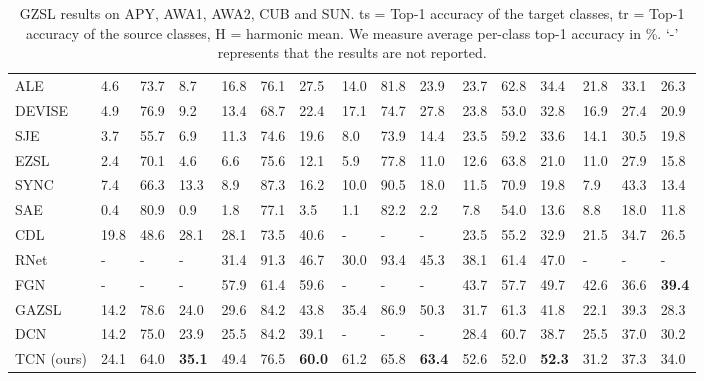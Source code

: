 \documentclass[10pt,twocolumn,letterpaper]{article}
\begin{document}
\begin{table*}[t]
\begin{center}
\begin{tabular}{|p{2cm}|p{0.5cm}p{0.5cm}p{0.5cm}|p{0.5cm}p{0.5cm}p{0.5cm}|p{0.5cm}p{0.5cm}p{0.5cm}|p{0.5cm}p{0.5cm}p{0.5cm}|p{0.5cm}p{0.5cm}p{0.5cm}|}
ALE \cite{akata2013label}                 &4.6   &73.7   &8.7   &16.8  &76.1   &27.5   &14.0  &81.8   &23.9   &23.7   &62.8   &34.4   &21.8   &33.1   &26.3 \\
DEVISE \cite{frome2013devise}             &4.9   &76.9   &9.2   &13.4  &68.7   &22.4   &17.1  &74.7   &27.8   &23.8   &53.0   &32.8   &16.9   &27.4   &20.9 \\
SJE \cite{akata2015evaluation}            &3.7   &55.7   &6.9   &11.3  &74.6   &19.6   &8.0   &73.9   &14.4   &23.5   &59.2   &33.6   &14.1   &30.5   &19.8 \\
EZSL \cite{romera2015embarrassingly}      &2.4   &70.1   &4.6   &6.6   &75.6   &12.1   &5.9   &77.8   &11.0   &12.6   &63.8   &21.0   &11.0   &27.9   &15.8 \\
SYNC \cite{Changpinyo2016SynthesizedCF}   &7.4   &66.3   &13.3  &8.9   &87.3   &16.2   &10.0  &90.5   &18.0   &11.5   &70.9   &19.8   &7.9    &43.3   &13.4 \\
SAE \cite{Kodirov2017SemanticAF}          &0.4   &80.9   &0.9   &1.8   &77.1   &3.5    &1.1   &82.2   &2.2    &7.8    &54.0   &13.6   &8.8    &18.0   &11.8 \\
CDL \cite{jiang2018learning}              &19.8  &48.6   &28.1  &28.1  &73.5   &40.6   &-     &-      &-      &23.5   &55.2   &32.9   &21.5   &34.7   &26.5 \\
RNet \cite{sung2018learning}              &-     &-      &-     &31.4  &91.3   &46.7   &30.0  &93.4   &45.3   &38.1   &61.4   &47.0   &-      &-      &-    \\
FGN \cite{xian2018feature}             &-     &-      &-     &57.9  &61.4   &59.6   &-     &-      &-   &43.7   &57.7   &49.7   &42.6    &36.6 &\textbf{39.4}    \\
GAZSL \cite{Zhu2018AGA}               &14.2  &78.6   &24.0  &29.6  &84.2   &43.8   &35.4     &86.9      &50.3      &31.7   &61.3   &41.8   &22.1 &39.3   &28.3 \\
DCN \cite{Liu2018GeneralizedZL}        &14.2  &75.0   &23.9  &25.5  &84.2   &39.1   &-     &-      &-      &28.4   &60.7   &38.7   &25.5   &37.0 &30.2 \\
\hline
TCN (ours)                               &24.1  &64.0   &\textbf{35.1}  &49.4  &76.5   &\textbf{60.0}   &61.2  &65.8   &\textbf{63.4}   &52.6 &52.0   &\textbf{52.3}   &31.2   &37.3   &34.0 \\
\hline
\end{tabular}
\end{center}
\caption{
GZSL results on APY, AWA1, AWA2, CUB and SUN. ts = Top-1 accuracy of the target classes, tr = Top-1 accuracy of the source classes, H = harmonic mean. We measure average per-class top-1 accuracy in \%. `-' represents that the results are not reported.
}
\label{table:compare2}
\end{table*}
\end{document}
